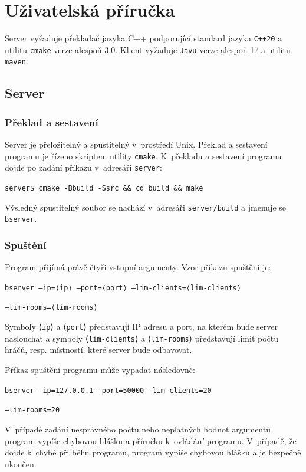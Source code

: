 \documentclass[a4paper, 12pt]{report}
\begin{document}
\chapter{Uživatelská příručka}

Server vyžaduje překladač jazyka C++ podporující standard jazyka \texttt{C++20} a utilitu \texttt{cmake} verze alespoň 3.0. Klient vyžaduje \texttt{Javu} verze alespoň 17 a utilitu \texttt{maven}.

\section{Server}

\subsection{Překlad a sestavení}

Server je přeložitelný a spustitelný v~prostředí Unix. Překlad a sestavení programu je řízeno skriptem utility \texttt{cmake}. K~překladu a sestavení programu dojde po zadání příkazu v~adresáři \texttt{server}:

\texttt{server\$ cmake -Bbuild -Ssrc \&\& cd build \&\& make}

Výsledný spustitelný soubor se nachází v~adresáři \texttt{server/build} a jmenuje se \texttt{bserver}.

\subsection{Spuštění}

Program přijímá právě čtyři vstupní argumenty. Vzor příkazu spuštění je:

\texttt{bserver --ip=⟨ip⟩ --port=⟨port⟩ --lim-clients=⟨lim-clients⟩}

\texttt{--lim-rooms=⟨lim-rooms⟩}

Symboly ⟨\texttt{ip}⟩ a ⟨\texttt{port}⟩ představují IP adresu a port, na kterém bude server naslouchat a symboly ⟨\texttt{lim-clients}⟩ a ⟨\texttt{lim-rooms}⟩ představují limit počtu hráčů, resp. místností, které server bude odbavovat.

Příkaz spuštění programu může vypadat následovně:

\texttt{bserver --ip=127.0.0.1 --port=50000 --lim-clients=20}

\texttt{--lim-rooms=20}

V~případě zadání nesprávného počtu nebo neplatných hodnot argumentů program vypíše chybovou hlášku a příručku k~ovládání programu. V~případě, že dojde k~chybě při běhu programu, program vypíše chybovou hlášku a je bezpečně ukončen.
\end{document}
